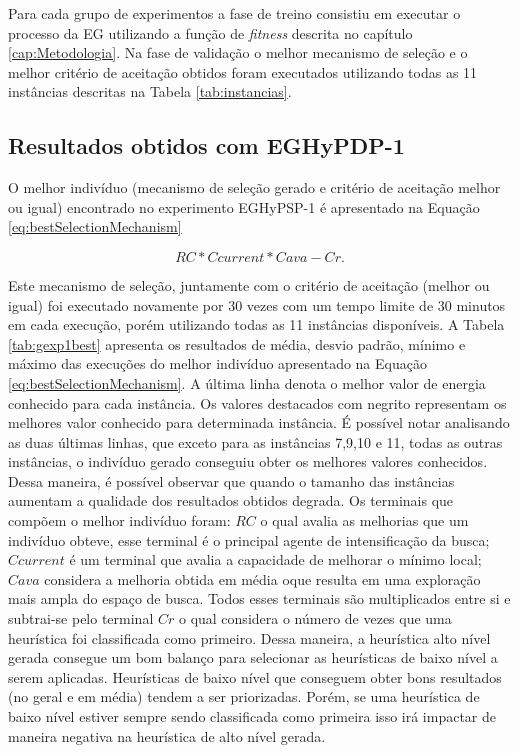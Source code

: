 	Para cada grupo de experimentos a fase de treino consistiu em executar o processo da EG utilizando a função de \textit{fitness} descrita no capítulo \ref{cap:Metodologia}. Na fase de validação o melhor mecanismo de seleção e o melhor critério de aceitação obtidos foram  executados utilizando todas as 11 instâncias descritas na Tabela \ref{tab:instancias}. 
	

	
	\subsection{Resultados obtidos com EGHyPDP-1}
	\label{subsection:gehypdp1results}
	
	O melhor indivíduo (mecanismo de seleção gerado e critério de aceitação melhor ou igual) encontrado no experimento EGHyPSP-1 é apresentado na Equação \ref{eq:bestSelectionMechanism}
	
	\begin{equation}
	\label{eq:bestSelectionMechanism}
	RC * Ccurrent * Cava -Cr.
	\end{equation}
	

	
	Este mecanismo de seleção, juntamente com o critério de aceitação (melhor ou igual) foi executado novamente por 30 vezes com um tempo limite de 30 minutos em cada execução, porém utilizando todas as 11 instâncias disponíveis. A Tabela  \ref{tab:gexp1best} apresenta os resultados de média, desvio padrão, mínimo e máximo das execuções do melhor indivíduo apresentado na Equação \ref{eq:bestSelectionMechanism}. A última linha denota o melhor valor de energia conhecido para cada instância. Os valores destacados com negrito representam os melhores valor conhecido para determinada instância. É possível notar analisando as duas últimas linhas, que exceto para as instâncias 7,9,10 e 11, todas as outras instâncias, o indivíduo gerado conseguiu obter os melhores valores conhecidos. Dessa maneira, é possível observar que quando o tamanho das instâncias aumentam a qualidade dos resultados obtidos degrada. Os terminais que compõem o melhor indivíduo foram: $RC$ o qual avalia as melhorias que um indivíduo obteve, esse terminal é o principal agente de intensificação da busca; $Ccurrent$ é um terminal que avalia a capacidade de melhorar o mínimo local; $Cava$ considera a melhoria obtida em média oque resulta em uma exploração mais ampla do espaço de busca. Todos esses terminais são multiplicados entre si e subtrai-se pelo terminal $Cr$ o qual considera o número de vezes que uma heurística foi classificada como primeiro. Dessa maneira, a heurística alto nível gerada consegue um bom balanço para selecionar as heurísticas de baixo nível a serem aplicadas. Heurísticas de baixo nível que conseguem obter bons resultados (no geral e em média) tendem a ser priorizadas. Porém, se uma heurística de baixo nível estiver sempre sendo classificada como primeira isso irá impactar de maneira negativa na heurística de alto nível gerada.
	

